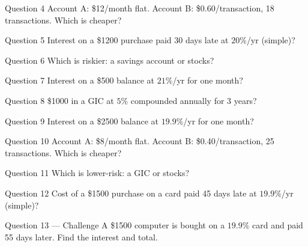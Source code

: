 \documentclass[11pt]{article}
\begin{document}
\begin{qbox}{Question 4}
Account A: \$12/month flat. Account B: \$0.60/transaction, 18 transactions. Which is cheaper?\workspace{2.4cm}
\end{qbox}

\begin{qbox}{Question 5}
Interest on a \$1200 purchase paid 30 days late at $20\%$/yr (simple)?\workspace{2.4cm}
\end{qbox}

\begin{qbox}{Question 6}
Which is riskier: a savings account or stocks?\workspace{2.4cm}
\end{qbox}

\begin{qbox}{Question 7}
Interest on a \$500 balance at $21\%$/yr for one month?\workspace{2.4cm}
\end{qbox}

\begin{qbox}{Question 8}
\$1000 in a GIC at $5\%$ compounded annually for 3 years?\workspace{2.4cm}
\end{qbox}

\begin{qbox}{Question 9}
Interest on a \$2500 balance at $19.9\%$/yr for one month?\workspace{2.4cm}
\end{qbox}

\begin{qbox}{Question 10}
Account A: \$8/month flat. Account B: \$0.40/transaction, 25 transactions. Which is cheaper?\workspace{2.4cm}
\end{qbox}

\begin{qbox}{Question 11}
Which is lower-risk: a GIC or stocks?\workspace{2.4cm}
\end{qbox}

\begin{qbox}{Question 12}
Cost of a \$1500 purchase on a card paid 45 days late at $19.9\%$/yr (simple)?\workspace{2.4cm}
\end{qbox}

\begin{qbox}{Question 13 --- Challenge}
A \$1500 computer is bought on a $19.9\%$ card and paid 55 days later. Find the interest and total.\workspace{3.5cm}
\end{qbox}

\clearpage
{}
\end{document}
